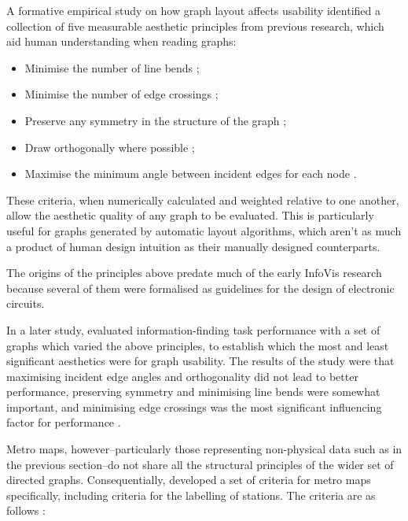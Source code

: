 A formative empirical study \citep{TheBasisForGraphDrawingAlgorithms} on how graph layout affects usability identified a collection of five measurable aesthetic principles from previous research, which aid human understanding when reading graphs:
\begin{itemize}[noitemsep]
	\item Minimise the number of line bends \citep{MinimiseBends};
	\item Minimise the number of edge crossings \citep{MinimiseEdgeCrossings};
	\item Preserve any symmetry in the structure of the graph \citep{PreserveSymmetry};
	\item Draw orthogonally where possible \citep{MinimiseBends};
	\item Maximise the minimum angle between incident edges for each node \citep{IncidentEdges}.
\end{itemize}
These criteria, when numerically calculated and weighted relative to one another, allow the aesthetic quality of any graph to be evaluated. This is particularly useful for graphs generated by automatic layout algorithms, which aren't as much a product of human design intuition as their manually designed counterparts.

The origins of the principles above predate much of the early InfoVis research because several of them \citep{MinimiseBends, MinimiseEdgeCrossings} were formalised as guidelines for the design of electronic circuits.

In a later study, \citeauthor{WhichAesthetic} evaluated information-finding task performance with a set of graphs which varied the above principles, to establish which the most and least significant aesthetics were for graph usability. The results of the study were that maximising incident edge angles and orthogonality did not lead to better performance, preserving symmetry and minimising line bends were somewhat important, and minimising edge crossings was the most significant influencing factor for performance \citep{WhichAesthetic}. 
 
Metro maps, however--particularly those representing non-physical data such as in the previous section--do not share all the structural principles of the wider set of directed graphs. Consequentially, \citeauthor{AutomaticMetroMapLayout} developed a set of criteria for metro maps specifically, including criteria for the labelling of stations. The criteria are as follows \citep{AutomaticMetroMapLayout}:

